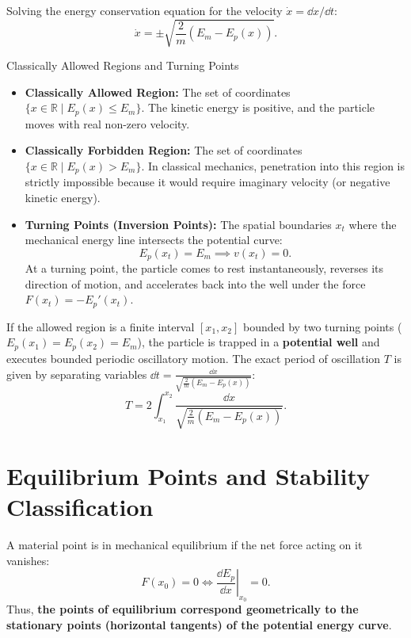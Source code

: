 Solving the energy conservation equation for the velocity $\dot{x} = \dd x/\dd t$:
\begin{equation}
\dot{x} = \pm \sqrt{\frac{2}{m}\left( E_m - E_p(x) \right)}.
\end{equation}

\begin{definitionbox}{Classically Allowed Regions and Turning Points}
\begin{itemize}[leftmargin=1.5em,itemsep=3pt]
  \item \textbf{Classically Allowed Region:} The set of coordinates $\{x \in \mathbb{R} \mid E_p(x) \le E_m\}$. The kinetic energy is positive, and the particle moves with real non-zero velocity.
  \item \textbf{Classically Forbidden Region:} The set of coordinates $\{x \in \mathbb{R} \mid E_p(x) > E_m\}$. In classical mechanics, penetration into this region is strictly impossible because it would require imaginary velocity (or negative kinetic energy).
  \item \textbf{Turning Points (Inversion Points):} The spatial boundaries $x_t$ where the mechanical energy line intersects the potential curve:
  \begin{equation}
  E_p(x_t) = E_m \implies v(x_t) = 0.
  \end{equation}
  At a turning point, the particle comes to rest instantaneously, reverses its direction of motion, and accelerates back into the well under the force $F(x_t) = -E_p'(x_t)$.
\end{itemize}
\end{definitionbox}

If the allowed region is a finite interval $[x_1, x_2]$ bounded by two turning points ($E_p(x_1) = E_p(x_2) = E_m$), the particle is trapped in a \textbf{potential well} and executes bounded periodic oscillatory motion. The exact period of oscillation $T$ is given by separating variables $\dd t = \frac{\dd x}{\sqrt{\frac{2}{m}(E_m - E_p(x))}}$:
\begin{equation}
T = 2 \int_{x_1}^{x_2} \frac{\dd x}{\sqrt{\frac{2}{m}\left( E_m - E_p(x) \right)}}.
\end{equation}

\section{Equilibrium Points and Stability Classification}

A material point is in mechanical equilibrium if the net force acting on it vanishes:
\begin{equation}
F(x_0) = 0 \iff \left.\frac{\dd E_p}{\dd x}\right|_{x_0} = 0.
\end{equation}
Thus, \textbf{the points of equilibrium correspond geometrically to the stationary points (horizontal tangents) of the potential energy curve}.


